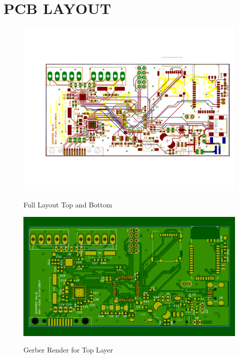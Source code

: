 \chapter{PCB LAYOUT}
\begin{figure}
\begin{center}
	\label{fig:FullLayout}
	\includegraphics[angle=0,scale=1,width=1\textwidth]{Images/rev1D_PCB.pdf} 
	\caption{Full Layout Top and Bottom}
\end{center}
\end{figure}


\begin{figure}
\begin{center}
	\label{fig:TOPGerber}
	\includegraphics[angle=0,scale=1,width=1\textwidth]{Images/Rev5_TOPGERB.png} 
	\caption{Gerber Render for Top Layer}
\end{center}
\end{figure}


